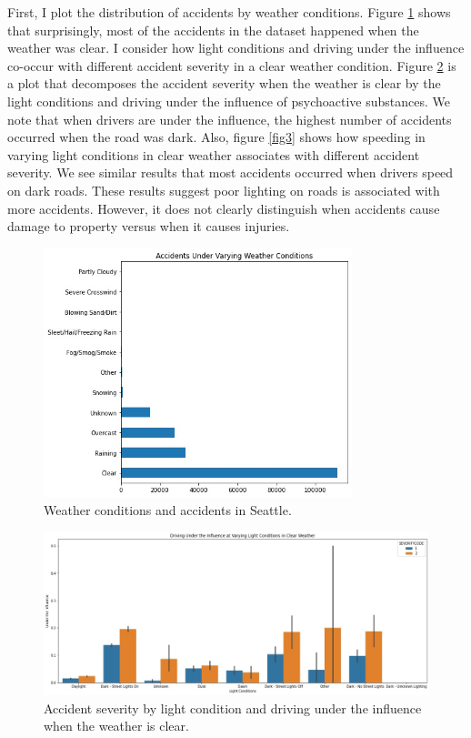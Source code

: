 \documentclass[a4paper,12pt]{article}
\begin{document}
First, I plot the distribution of accidents by weather conditions. Figure \ref{fig1} shows that surprisingly, most of the accidents in the dataset happened when the weather was clear. I consider how light conditions and driving under the influence co-occur with different accident severity in a clear weather condition. Figure \ref{fig2} is a plot that decomposes the accident severity when the weather is clear by the light conditions and driving under the influence of psychoactive substances. We note that when drivers are under the influence, the highest number of accidents occurred when the road was dark. Also, figure \ref{fig3} shows how speeding in varying light conditions in clear weather associates with different accident severity. We see similar results that most accidents occurred when drivers speed on dark roads. These results suggest poor lighting on roads is associated with more accidents. However, it does not clearly distinguish when accidents cause damage to property versus when it causes injuries. \\



\begin{figure}[H]
	\centering
	\includegraphics[width=0.8\textwidth]{weather.jpg}
	\caption{Weather conditions and accidents in Seattle.}
	\label{fig1}
\end{figure}


\begin{figure}[H]
	\centering
	\includegraphics[width=1.0\textwidth]{li_un_wet.jpg}
	\caption{Accident severity by light condition and driving under the influence when the weather is clear. }
	\label{fig2}
\end{figure}
\end{document}
